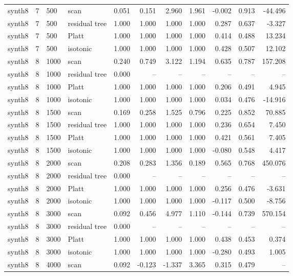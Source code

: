 \begin{tabular}{lrllrrrrrrr}
synth8 & 7 & 500 & scan & 0.051 & 0.151 & 2.960 & 1.961 & -0.002 & 0.913 & -44.496 \\
synth8 & 7 & 500 & residual tree & 1.000 & 1.000 & 1.000 & 1.000 & 0.287 & 0.637 & -3.327 \\
synth8 & 7 & 500 & Platt & 1.000 & 1.000 & 1.000 & 1.000 & 0.414 & 0.488 & 13.234 \\
synth8 & 7 & 500 & isotonic & 1.000 & 1.000 & 1.000 & 1.000 & 0.428 & 0.507 & 12.102 \\
synth8 & 8 & 1000 & scan & 0.240 & 0.749 & 3.122 & 1.194 & 0.635 & 0.787 & 157.208 \\
synth8 & 8 & 1000 & residual tree & 0.000 & -- & -- & -- & -- & -- & -- \\
synth8 & 8 & 1000 & Platt & 1.000 & 1.000 & 1.000 & 1.000 & 0.206 & 0.491 & 4.945 \\
synth8 & 8 & 1000 & isotonic & 1.000 & 1.000 & 1.000 & 1.000 & 0.034 & 0.476 & -14.916 \\
synth8 & 8 & 1500 & scan & 0.169 & 0.258 & 1.525 & 0.796 & 0.225 & 0.852 & 70.885 \\
synth8 & 8 & 1500 & residual tree & 1.000 & 1.000 & 1.000 & 1.000 & 0.236 & 0.654 & 7.450 \\
synth8 & 8 & 1500 & Platt & 1.000 & 1.000 & 1.000 & 1.000 & 0.421 & 0.561 & 7.405 \\
synth8 & 8 & 1500 & isotonic & 1.000 & 1.000 & 1.000 & 1.000 & -0.080 & 0.548 & 4.417 \\
synth8 & 8 & 2000 & scan & 0.208 & 0.283 & 1.356 & 0.189 & 0.565 & 0.768 & 450.076 \\
synth8 & 8 & 2000 & residual tree & 0.000 & -- & -- & -- & -- & -- & -- \\
synth8 & 8 & 2000 & Platt & 1.000 & 1.000 & 1.000 & 1.000 & 0.256 & 0.476 & -3.631 \\
synth8 & 8 & 2000 & isotonic & 1.000 & 1.000 & 1.000 & 1.000 & -0.117 & 0.500 & -8.756 \\
synth8 & 8 & 3000 & scan & 0.092 & 0.456 & 4.977 & 1.110 & -0.144 & 0.739 & 570.154 \\
synth8 & 8 & 3000 & residual tree & 0.000 & -- & -- & -- & -- & -- & -- \\
synth8 & 8 & 3000 & Platt & 1.000 & 1.000 & 1.000 & 1.000 & 0.438 & 0.453 & 0.374 \\
synth8 & 8 & 3000 & isotonic & 1.000 & 1.000 & 1.000 & 1.000 & -0.280 & 0.493 & 1.005 \\
synth8 & 8 & 4000 & scan & 0.092 & -0.123 & -1.337 & 3.365 & 0.315 & 0.479 & -- \\

\end{tabular}
